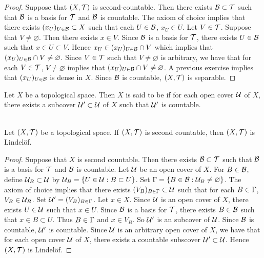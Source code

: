 \documentclass{book}
\begin{document}
	\begin{proof}
		Suppose that $(X, \mathcal{T})$ is second-countable. Then there exists $\mathcal{B} \subset \mathcal{T}$ such that $\mathcal{B}$ is a basis for $\mathcal{T}$ and $\mathcal{B}$ is countable. The axiom of choice implies that there exists $(x_U)_{U \in \mathcal{B}} \subset X$ such that each $U \in \mathcal{B}$, $x_U \in U$. Let $V \in \mathcal{T}$. Suppose that $V \neq \varnothing$. Then there exists $x \in V$. Since $\mathcal{B}$ is a basis for $\mathcal{T}$, there exists $U \in \mathcal{B}$ such that $x \in U \subset V$. Hence $x_U \in (x_U)_{U \in \mathcal{B}} \cap V$ which implies that $(x_U)_{U \in \mathcal{B}} \cap V \neq \varnothing$. Since $V \in \mathcal{T}$ such that $V \neq \varnothing$ is arbitrary, we have that for each $V \in \mathcal{T}$, $V \neq \varnothing$ implies that $(x_U)_{U \in \mathcal{B}} \cap V \neq \varnothing$. A previous exercise implies that $(x_U)_{U \in \mathcal{B}}$ is dense in $X$. Since $\mathcal{B}$ is countable, $(X, \mathcal{T})$ is separable.
	\end{proof}

	\begin{defn}
		Let $X$ be a topological space. Then $X$ is said to be  if for each open cover $\mathcal{U}$ of $X$, there exists a subcover $\mathcal{U}' \subset \mathcal{U}$ of $X$ such that $\mathcal{U}'$ is countable.\\
		\\
	\end{defn}

	\begin{ex}
		Let $(X, \mathcal{T})$ be a topological space. If $(X, \mathcal{T})$ is second countable, then $(X, \mathcal{T})$ is Lindel\"{o}f. 
	\end{ex}

	\begin{proof}
		Suppose that $X$ is second countable. Then there exists $\mathcal{B} \subset \mathcal{T}$ such that $\mathcal{B}$ is a basis for $\mathcal{T}$ and $\mathcal{B}$ is countable. Let $\mathcal{U}$ be an open cover of $X$. For $B \in \mathcal{B}$, define $\mathcal{U}_{B} \subset \mathcal{U}$ by 
		$\mathcal{U}_{B} = \{U \in \mathcal{U}: B \subset U\}$. Set $\Gamma = \{B \in \mathcal{B}: \mathcal{U}_B \neq \varnothing\}$. The axiom of choice implies that there exists $(V_B)_{B \in \Gamma} \subset \mathcal{U}$ such that for each $B \in \Gamma$, $V_B \in \mathcal{U}_B$. Set $\mathcal{U}' = (V_B)_{B \in \Gamma}$. Let $x \in X$. Since $\mathcal{U}$ is an open cover of $X$, there exists $U \in \mathcal{U}$ such that $x \in U$. Since $\mathcal{B}$ is a basis for $\mathcal{T}$, there exists $B \in \mathcal{B}$ such that $x \in B \subset U$. Thus $B \in \Gamma$ and $x \in V_B$. So $\mathcal{U}'$ is an subcover of $\mathcal{U}$. Since $\mathcal{B}$ is countable, $\mathcal{U}'$ is countable. Since $\mathcal{U}$ is an arbitrary open cover of $X$, we have that for each open cover $\mathcal{U}$ of $X$, there exists a countable subscover $\mathcal{U}' \subset \mathcal{U}$. Hence $(X, \mathcal{T})$ is Lindel\"{o}f.
	\end{proof}
\end{document}
